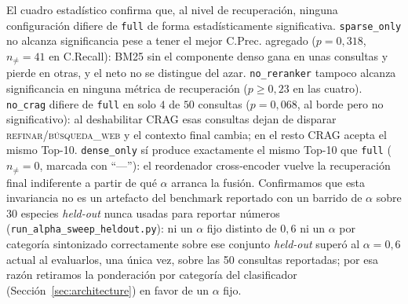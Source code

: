 \documentclass[runningheads]{llncs}
\begin{document}
El cuadro estad\'{i}stico confirma que, al nivel de recuperaci\'{o}n, ninguna configuraci\'{o}n difiere de \texttt{full} de forma estad\'{i}sticamente significativa. \texttt{sparse\_only} no alcanza significancia pese a tener el mejor C.Prec. agregado ($p{=}0{,}318$, $n_{\neq}{=}41$ en C.Recall): BM25 sin el componente denso gana en unas consultas y pierde en otras, y el neto no se distingue del azar. \texttt{no\_reranker} tampoco alcanza significancia en ninguna m\'{e}trica de recuperaci\'{o}n ($p{\geq}0{,}23$ en las cuatro). \texttt{no\_crag} difiere de \texttt{full} en solo $4$ de $50$ consultas ($p{=}0{,}068$, al borde pero no significativo): al deshabilitar CRAG esas consultas dejan de disparar \textsc{refinar}/\textsc{b\'{u}squeda\_web} y el contexto final cambia; en el resto CRAG acepta el mismo Top-10. \texttt{dense\_only} s\'{i} produce exactamente el mismo Top-10 que \texttt{full} ($n_{\neq}{=}0$, marcada con ``---''): el reordenador cross-encoder vuelve la recuperaci\'{o}n final indiferente a partir de qu\'{e} $\alpha$ arranca la fusi\'{o}n. Confirmamos que esta invariancia no es un artefacto del benchmark reportado con un barrido de $\alpha$ sobre 30 especies \emph{held-out} nunca usadas para reportar n\'{u}meros (\texttt{run\_alpha\_sweep\_heldout.py}): ni un $\alpha$ fijo distinto de $0{,}6$ ni un $\alpha$ por categor\'{i}a sintonizado correctamente sobre ese conjunto \emph{held-out} super\'{o} al $\alpha{=}0{,}6$ actual al evaluarlos, una \'{u}nica vez, sobre las 50 consultas reportadas; por esa raz\'{o}n retiramos la ponderaci\'{o}n por categor\'{i}a del clasificador (Secci\'{o}n~\ref{sec:architecture}) en favor de un $\alpha$ fijo.
\end{document}
